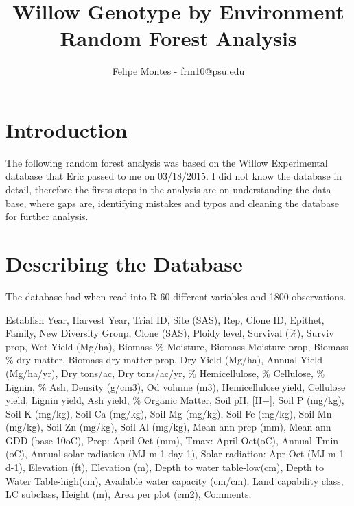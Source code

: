\documentclass{article}\usepackage[]{graphicx}\usepackage[]{color}
\begin{document}
\title{Willow Genotype by Environment\\ Random Forest Analysis}
\author{Felipe Montes - frm10@psu.edu}
\maketitle


\section*{Introduction}

The following random forest analysis was based on the Willow Experimental database that Eric passed to me on 03/18/2015. I did not know the database in detail, therefore the firsts steps in the analysis are on understanding the data base, where gaps are, identifying mistakes and typos and cleaning the database for further analysis.



\section*{Describing the Database}

The database had when read into R 60 different variables and 1800 observations.

Establish Year,  Harvest Year,  Trial ID,	Site (SAS),	Rep,	Clone ID,	Epithet,	Family,	New Diversity Group,	Clone (SAS),	Ploidy level,	Survival (\%),	Surviv prop,	Wet Yield (Mg/ha),	Biomass \% Moisture,	Biomass Moisture prop,	Biomass \% dry matter,	Biomass dry matter prop,	Dry Yield (Mg/ha),	Annual Yield (Mg/ha/yr),	Dry tons/ac,	Dry tons/ac/yr,	\% Hemicellulose,	\% Cellulose,	\% Lignin,	\% Ash,	Density (g/cm3),	Od volume (m3),	Hemicellulose yield, Cellulose yield,	Lignin yield,	Ash yield,	\% Organic Matter,	Soil pH,	[H+],	Soil P (mg/kg),	Soil K (mg/kg),	Soil Ca (mg/kg),	Soil Mg (mg/kg),	Soil Fe (mg/kg),	Soil Mn (mg/kg),	Soil Zn (mg/kg),	Soil Al (mg/kg),	Mean ann prcp (mm),	Mean ann GDD (base 10oC),	Prcp: April-Oct (mm),	Tmax: April-Oct(oC),	Annual Tmin (oC),	Annual solar radiation (MJ m-1 day-1),	Solar radiation: Apr-Oct (MJ m-1 d-1),	Elevation (ft),	Elevation (m),	Depth to water table-low(cm),	Depth to Water Table-high(cm),	Available water capacity (cm/cm),	Land capability class,	LC subclass,	Height (m),	Area per plot (cm2),	Comments.\\
\end{document}
